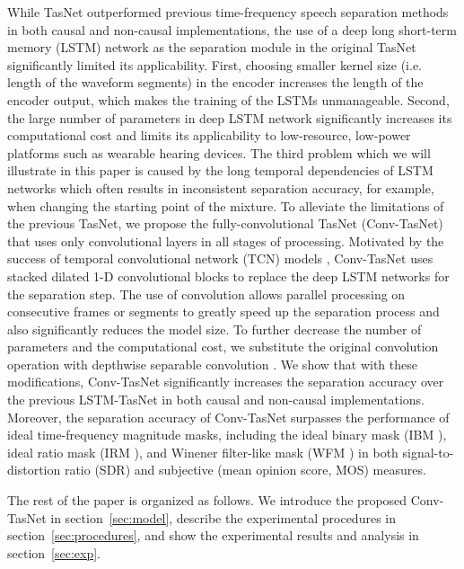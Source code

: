 \documentclass[journal]{IEEEtran}
\begin{document}
While TasNet outperformed previous time-frequency speech separation methods in both causal and non-causal implementations, the use of a deep long short-term memory (LSTM) network as the separation module in the original TasNet significantly limited its applicability. First, choosing smaller kernel size (i.e. length of the waveform segments) in the encoder increases the length of the encoder output, which makes the training of the LSTMs unmanageable. Second, the large number of parameters in deep LSTM network significantly increases its computational cost and limits its applicability to low-resource, low-power platforms such as wearable hearing devices. The third problem which we will illustrate in this paper is caused by the long temporal dependencies of LSTM networks which often results in inconsistent separation accuracy, for example, when changing the starting point of the mixture. To alleviate the limitations of the previous TasNet, we propose the fully-convolutional TasNet (Conv-TasNet) that uses only convolutional layers in all stages of processing. Motivated by the success of temporal convolutional network (TCN) models \cite{lea2016temporal, lea2017temporal, bai2018empirical}, Conv-TasNet uses stacked dilated 1-D convolutional blocks to replace the deep LSTM networks for the separation step. The use of convolution allows parallel processing on consecutive frames or segments to greatly speed up the separation process and also significantly reduces the model size. To further decrease the number of parameters and the computational cost, we substitute the original convolution operation with depthwise separable convolution \cite{chollet2016xception, howard2017mobilenets}. We show that with these modifications, Conv-TasNet significantly increases the separation accuracy over the previous LSTM-TasNet in both causal and non-causal implementations. Moreover, the separation accuracy of Conv-TasNet surpasses the performance of ideal time-frequency magnitude masks, including the ideal binary mask (IBM \cite{wang2005ideal}), ideal ratio mask (IRM \cite{li2009optimality, wang2014training}), and Winener filter-like mask (WFM \cite{erdogan2015phase}) in both signal-to-distortion ratio (SDR) and subjective (mean opinion score, MOS) measures.

The rest of the paper is organized as follows. We introduce the proposed Conv-TasNet in section~\ref{sec:model}, describe the experimental procedures in section~\ref{sec:procedures}, and show the experimental results and analysis in section~\ref{sec:exp}.  
\end{document}

